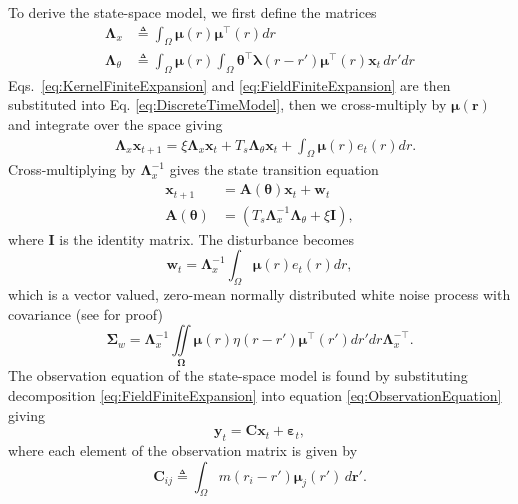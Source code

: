 \documentclass[journal,a4paper]{IEEEtran}
\begin{document}
To derive the state-space model, we first define the matrices
\begin{align}\label{eq:Lambdax}
 \mathbf{\Lambda}_{x} &\triangleq \int_{\Omega}\boldsymbol\mu\left(r\right)\boldsymbol\mu^\top\left(r\right) dr \\
\label{eq:Lambdatheta}
 \mathbf{\Lambda}_{\theta} &\triangleq \int_{\Omega}\boldsymbol\mu\left(r\right) \int_\Omega { 
	   \boldsymbol\theta^\top\boldsymbol\lambda\left(r-r'\right)
	    \boldsymbol\mu^\top\left(r\right)\mathbf{x}_t 
	\, dr'dr}
\end{align}
Eqs.~\eqref{eq:KernelFiniteExpansion} and \eqref{eq:FieldFiniteExpansion} are then substituted into Eq. \eqref{eq:DiscreteTimeModel}, then we cross-multiply by $\boldsymbol\mu\left(\mathbf r\right)$ and integrate over the space giving
\begin{align}\label{eq:DecomposedModel2} 
	&\mathbf{\Lambda}_{x} \mathbf{x}_{t+1}= 
	\xi\mathbf{\Lambda}_{x} \mathbf{x}_t +T_s \mathbf{\Lambda}_{\theta}\mathbf{x}_t +\int_{\Omega}\boldsymbol\mu\left(r\right)e_t\left(r\right)dr.
\end{align}
Cross-multiplying by $\mathbf{\Lambda}_{x}^{-1}$ gives the state transition equation
\begin{align}\label{eq:StateEquation}
 \mathbf x_{t+1} &=\mathbf A(\boldsymbol \theta) \mathbf x_t+ \mathbf w_t\\
\label{eq:A_theta}
 \mathbf A(\boldsymbol \theta) &= (T_s\mathbf{\Lambda}_{x}^{-1}\mathbf{\Lambda}_{\theta}+\xi\mathbf I),
\end{align}
where $\mathbf I$ is the identity matrix. The disturbance becomes 
\begin{equation}\label{eq:Disturbance}
\mathbf w_t= \mathbf{\Lambda}_{x}^{-1}\int_{\Omega}\boldsymbol\mu \left(r\right)e_t\left(r\right)dr,
\end{equation}
which is a vector valued, zero-mean normally distributed white noise process with covariance (see \cite{Scerri2009} for proof)
\begin{equation}
\boldsymbol\Sigma_w =\mathbf{\Lambda}_{x}^{-1}\iint\limits_{\boldsymbol\Omega}\boldsymbol\mu\left(r\right) \eta\left(r-r'\right)\boldsymbol\mu^{\top}\left(r'\right)dr'dr\mathbf{\Lambda}_{x}^{-\top}.
\end{equation}
The observation equation of the state-space model is found by substituting decomposition \eqref{eq:FieldFiniteExpansion}
 into equation \eqref{eq:ObservationEquation} giving
\begin{equation}\label{eq:ReducedObservationEquation} 
	\mathbf{y}_t = \mathbf{C}\mathbf{x}_t + \boldsymbol{\varepsilon}_t,
\end{equation}
where each element of the observation matrix is given by
\begin{equation}
	\mathbf{C}_{ij} \triangleq \int_{\Omega}m(r_i - r')\boldsymbol{\mu}_j(r') \, d\mathbf{r}'.
\end{equation}
\end{document}
